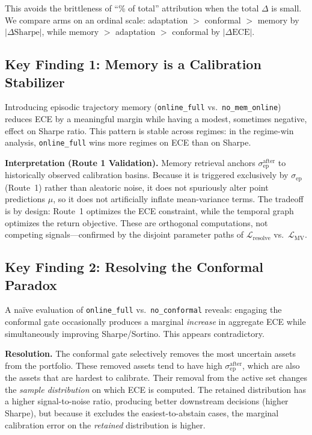 \documentclass[11pt,a4paper]{article}
\newcommand{\sep}{\sigma_{\mathrm{ep}}}
\newcommand{\sepa}{\sigma_{\mathrm{ep}}^{\mathrm{after}}}
\newcommand{\Lres}{\mathcal{L}_{\mathrm{resolve}}}
\begin{document}
This avoids the brittleness of ``\% of total'' attribution when the total
$\Delta$ is small. We compare arms on an ordinal scale: adaptation $>$ conformal
$>$ memory by $|\Delta\mathrm{Sharpe}|$, while memory $>$ adaptation $>$ conformal
by $|\Delta\mathrm{ECE}|$.

\subsection{Key Finding 1: Memory is a Calibration Stabilizer}
\label{sec:memory_finding}

Introducing episodic trajectory memory (\texttt{online\_full} vs.\
\texttt{no\_mem\_online}) reduces ECE by a meaningful margin while having a
modest, sometimes negative, effect on Sharpe ratio.  This pattern is stable
across regimes: in the regime-win analysis, \texttt{online\_full} wins more
regimes on ECE than on Sharpe.

\textbf{Interpretation (Route 1 Validation).}  Memory retrieval anchors $\sepa$ to historically
observed calibration basins.  Because it is triggered exclusively by $\sep$ (Route~1)
rather than aleatoric noise, it does not spuriously alter point predictions $\mu$,
so it does not artificially inflate mean-variance terms.  The tradeoff is by design:
Route~1 optimizes the ECE constraint, while the temporal graph optimizes the return objective.
These are orthogonal computations, not competing signals—confirmed by the
disjoint parameter paths of $\Lres$ vs.\ $\mathcal{L}_{\mathrm{MV}}$.

\subsection{Key Finding 2: Resolving the Conformal Paradox}
\label{sec:conformal_paradox}

A na\"ive evaluation of \texttt{online\_full} vs.\ \texttt{no\_conformal}
reveals: engaging the conformal gate occasionally produces a marginal
\emph{increase} in aggregate ECE while simultaneously improving Sharpe/Sortino.
This appears contradictory.

\textbf{Resolution.}  The conformal gate selectively removes the most
uncertain assets from the portfolio.  These removed assets tend to have high
$\sepa$, which are also the assets that are hardest to calibrate.  Their
removal from the active set changes the \emph{sample distribution} on which
ECE is computed.  The retained distribution has a higher signal-to-noise ratio,
producing better downstream decisions (higher Sharpe), but because it excludes
the easiest-to-abstain cases, the marginal calibration error on the
\emph{retained} distribution is higher.
\end{document}
